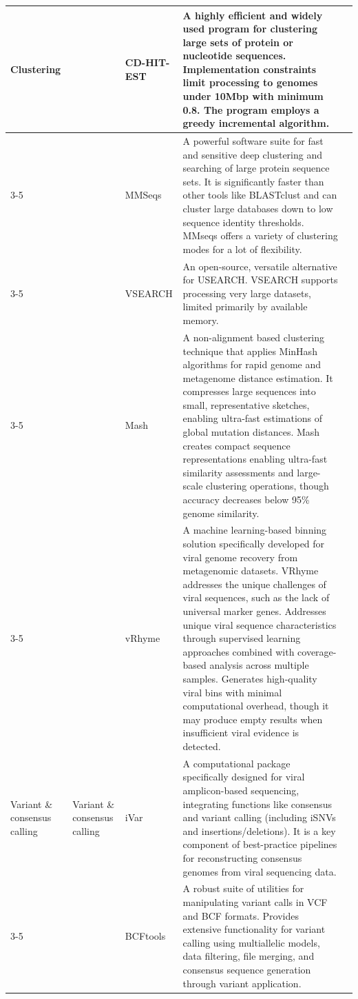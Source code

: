 \begin{longtable}{p{2cm}p{1.8cm}p{1.8cm}p{8.3cm}p{1cm}}
Clustering & & CD-HIT-EST & A highly efficient and widely used program for clustering large sets of protein or nucleotide sequences. Implementation constraints limit processing to genomes under 10Mbp with minimum 0.8. The program employs a greedy incremental algorithm. & \citep{Li2006-nj} \\
\cmidrule{3-5}
 &  & MMSeqs & A powerful software suite for fast and sensitive deep clustering and searching of large protein sequence sets. It is significantly faster than other tools like BLASTclust and can cluster large databases down to low sequence identity thresholds. MMseqs offers a variety of clustering modes for a lot of flexibility. & \citep{Steinegger2017-ci} \\
\cmidrule{3-5}
 &  & VSEARCH & An open-source, versatile alternative for USEARCH. VSEARCH supports processing very large datasets, limited primarily by available memory. & \citep{Rognes2016-ju} \\
\cmidrule{3-5}
 &  & Mash & A non-alignment based clustering technique that applies MinHash algorithms for rapid genome and metagenome distance estimation. It compresses large sequences into small, representative sketches, enabling ultra-fast estimations of global mutation distances. Mash creates compact sequence representations enabling ultra-fast similarity assessments and large-scale clustering operations, though accuracy decreases below 95\% genome similarity. & \citep{Ondov2019-bo} \\
\cmidrule{3-5}
 &  & vRhyme & A machine learning-based binning solution specifically developed for viral genome recovery from metagenomic datasets. VRhyme addresses the unique challenges of viral sequences, such as the lack of universal marker genes. Addresses unique viral sequence characteristics through supervised learning approaches combined with coverage-based analysis across multiple samples. Generates high-quality viral bins with minimal computational overhead, though it may produce empty results when insufficient viral evidence is detected. & \citep{Kieft2022-km} \\
\midrule

Variant \& consensus calling & Variant \& consensus calling & iVar & A computational package specifically designed for viral amplicon-based sequencing, integrating functions like consensus and variant calling (including iSNVs and insertions/deletions). It is a key component of best-practice pipelines for reconstructing consensus genomes from viral sequencing data. & \citep{Grubaugh2019-xd} \\
\cmidrule{3-5}
 &  & BCFtools & A robust suite of utilities for manipulating variant calls in VCF and BCF formats. Provides extensive functionality for variant calling using multiallelic models, data filtering, file merging, and consensus sequence generation through variant application. & \citep{Danecek2021-je} \\
\bottomrule
\end{longtable}


